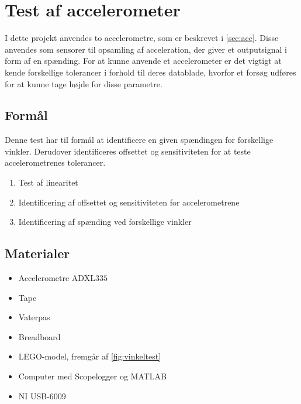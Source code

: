 \section{Test af accelerometer} 
\label{sec:test_acc}
I dette projekt anvendes to accelerometre, som er beskrevet i \autoref{sec:acc}. Disse anvendes som sensorer til opsamling af acceleration, der giver et outputsignal i form af en spænding. For at kunne anvende et accelerometer er det vigtigt at kende forskellige tolerancer i forhold til deres datablade, hvorfor et forsøg udføres for at kunne tage højde for disse parametre.

\subsection{Formål}\label{sec:acc_formaal}
Denne test har til formål at identificere en given spændingen for forskellige vinkler. Derudover identificeres %
offsettet og sensitiviteten for at teste accelerometrenes tolerancer.

\begin{enumerate}
\item Test af linearitet
\item Identificering af offsettet og sensitiviteten for accelerometrene
\item Identificering af spænding ved forskellige vinkler
\end{enumerate}

\subsection{Materialer}
\begin{itemize}
\item Accelerometre ADXL$335$
\item Tape
\item Vaterpas
\item Breadboard
\item LEGO-model, fremgår af \autoref{fig:vinkeltest}
\item Computer med Scopelogger og MATLAB
\item NI USB-6009
\end{itemize}

